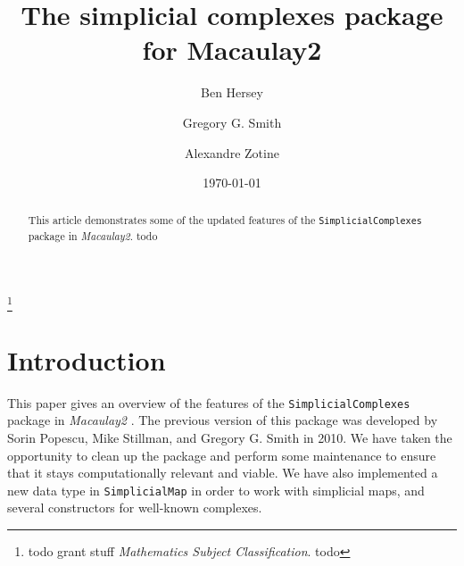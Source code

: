\documentclass[12pt,leqno]{amsart}
\theoremstyle{definition}
\begin{document}
\title[Simplicial Complexes]{The simplicial complexes package for Macaulay2}
\author[B.~Hersey]{Ben Hersey}
\address{Ben Hersey: Department of Mathematics and Statistics, Queen's University, Kingston, Ontario, K7L 3N6;
  {\normalfont \texttt{b.hersey@queensu.ca}}}

\author[G.G.~Smith]{Gregory G.{} Smith}
\address{Gregory G.{} Smith: Department of Mathematics and Statistics, Queen's
  University, Kingston, Ontario, K7L 3N6, Canada; {\normalfont
    \texttt{ggsmith@mast.queensu.ca}}}

\author[A.~Zotine]{Alexandre Zotine}
\address{Alexandre Zotine: Department of Mathematics and Statistics, Queen's University, Kingston, Ontario, K7L 3N6;
  {\normalfont \texttt{18az45@queensu.ca}}}

\thanks{todo grant stuff \emph{Mathematics Subject Classification}. todo}
\date{\today}

\begin{abstract}
  This article demonstrates some of the updated features of the \texttt{SimplicialComplexes} package in \emph{Macaulay2}. todo
\end{abstract}

\maketitle


\addtocounter{lemma}{-1}

\noindent

\section{Introduction}
\label{S:Introduction}

This paper gives an overview of the features of the \texttt{SimplicialComplexes} package in \emph{Macaulay2} \cite{M2}. The previous version of this package was developed by Sorin Popescu, Mike Stillman, and Gregory G. Smith in 2010. We have taken the opportunity to clean up the package and perform some maintenance to ensure that it stays computationally relevant and viable. We have also implemented a new data type in \texttt{SimplicialMap} in order to work with simplicial maps, and several constructors for well-known complexes.
\end{document}

